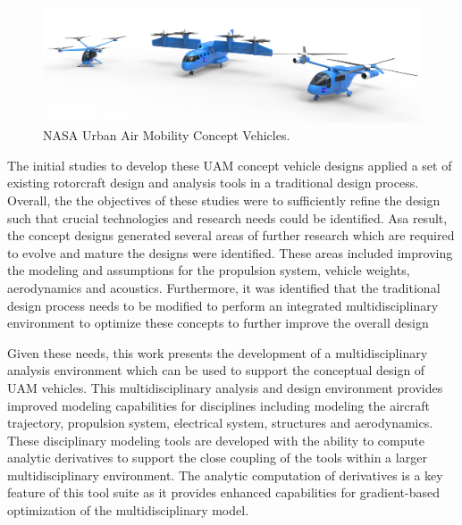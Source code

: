 \begin{figure}
\begin{center}
 \includegraphics[width=1.0\textwidth]{../Images/UAM_GROUP1.jpg}
 \caption{NASA Urban Air Mobility Concept Vehicles.}
 \label{f:UAM}
\end{center}
\end{figure}



The initial studies to develop these UAM concept vehicle designs applied a set of existing rotorcraft design and analysis tools in a traditional design process.
Overall, the the objectives of these studies were to sufficiently refine the design such that crucial technologies and research needs could be identified. 
Asa result, the concept designs generated several areas of further research which are required to evolve and mature the designs were identified.
These areas included improving the modeling and assumptions for the propulsion system, vehicle weights, aerodynamics and acoustics.\cite{johnson2018concept}
Furthermore, it was identified that the traditional design process needs to be modified to perform an integrated multidisciplinary environment to optimize these concepts to further improve the overall design

Given these needs, this work presents the development of a multidisciplinary analysis environment which can be used to support the conceptual design of UAM vehicles.
This multidisciplinary analysis and design environment provides improved modeling capabilities for disciplines including modeling the aircraft trajectory, propulsion system, electrical system, structures and aerodynamics. %
These disciplinary modeling tools are developed with the ability to compute analytic derivatives to support the close coupling of the tools within a larger multidisciplinary environment.
The analytic computation of derivatives is a key feature of this tool suite as it provides enhanced capabilities for gradient-based optimization of the multidisciplinary model. 


